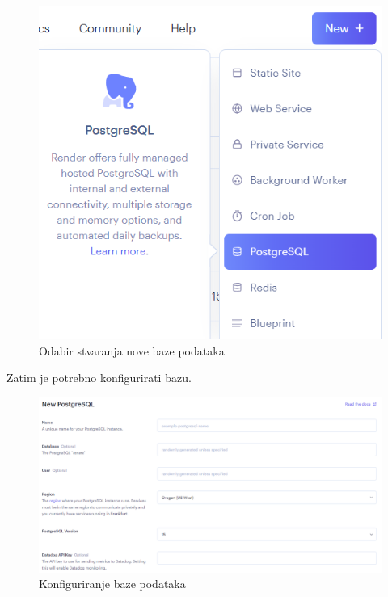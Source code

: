 			\begin{figure}[H]
				\includegraphics[scale=0.8]{slike/upute/odabirStvaranjaBaze.png} %
				\centering
				\caption{Odabir stvaranja nove baze podataka}
				\label{fig:odabirStvaranjaBaze} %
			\end{figure}
			
			Zatim je potrebno konfigurirati bazu.
			
			\begin{figure}[H]
				\includegraphics[width=\textwidth]{slike/upute/konfiguriranjeBaze.png} %
				\caption{Konfiguriranje baze podataka}
				\label{fig:konfiguriranjeBaze} %
			\end{figure}
			
